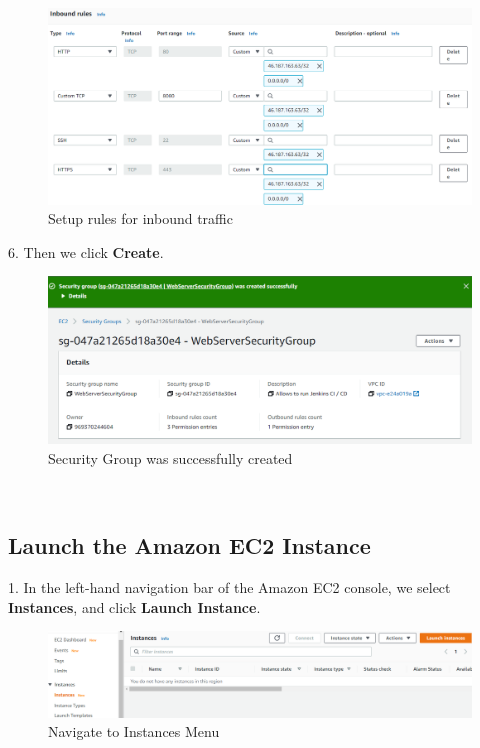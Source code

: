 \documentclass[12pt,a4paper,twoside]{article}
\begin{document}
\begin{figure}[H]
    \centering
        \includegraphics[width=15cm]{images-aws/2-inbound-rules.png}
        \caption{Setup rules for inbound traffic}
\end{figure}


6. Then we click \textbf{Create}.


\begin{figure}[H]
    \centering
        \includegraphics[width=15cm]{images-aws/3-create-sg-created.png}
        \caption{Security Group was successfully created}
\end{figure}


~\newpage

\subsection{Launch the Amazon EC2 Instance}


1. In the left-hand navigation bar of the Amazon EC2 console, we select \textbf{Instances}, and click \textbf{Launch Instance}.


\begin{figure}[H]
    \centering
        \includegraphics[width=15cm]{images-aws/4-instances.png}
        \caption{Navigate to Instances Menu}
\end{figure}
\end{document}
